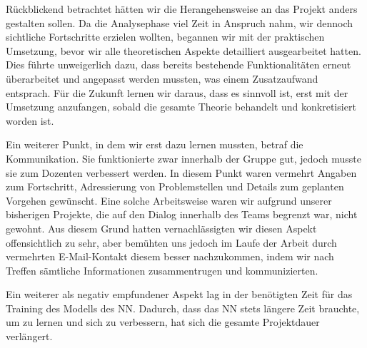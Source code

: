 \documentclass[12pt,a4paper]{article}
\begin{document}
Rückblickend betrachtet hätten wir die Herangehensweise an das Projekt anders gestalten sollen. Da die Analysephase viel Zeit in Anspruch nahm, wir dennoch sichtliche Fortschritte erzielen wollten, begannen wir mit der praktischen Umsetzung, bevor wir alle theoretischen Aspekte detailliert ausgearbeitet hatten. Dies führte unweigerlich dazu, dass bereits bestehende Funktionalitäten erneut überarbeitet und angepasst werden mussten, was einem Zusatzaufwand entsprach. Für die Zukunft lernen wir daraus, dass es sinnvoll ist, erst mit der Umsetzung anzufangen, sobald die gesamte Theorie behandelt und konkretisiert worden ist.

Ein weiterer Punkt, in dem wir erst dazu lernen mussten, betraf die Kommunikation. Sie funktionierte zwar innerhalb der Gruppe gut, jedoch musste sie zum Dozenten verbessert werden. In diesem Punkt waren vermehrt Angaben zum Fortschritt, Adressierung von Problemstellen und Details zum geplanten Vorgehen gewünscht. Eine solche Arbeitsweise waren wir aufgrund unserer bisherigen Projekte, die auf den Dialog innerhalb des Teams begrenzt war, nicht gewohnt. Aus diesem Grund hatten vernachlässigten wir diesen Aspekt offensichtlich zu sehr, aber bemühten uns jedoch im Laufe der Arbeit durch vermehrten E-Mail-Kontakt diesem besser nachzukommen, indem wir nach Treffen sämtliche Informationen zusammentrugen und kommunizierten.

Ein weiterer als negativ empfundener Aspekt lag in der benötigten Zeit für das Training des Modells des NN. Dadurch, dass das NN stets längere Zeit brauchte, um zu lernen und sich zu verbessern, hat sich die gesamte Projektdauer verlängert.



\pagebreak

\end{document}
